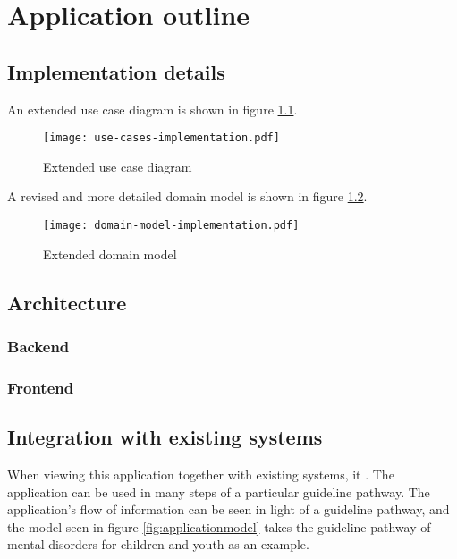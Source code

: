 \chapter{Application outline}
\label{ch:outline}

\section{Implementation details}

An extended use case diagram is shown in figure \ref{fig:usecases2}.

\begin{figure}
    \centering
    \texttt{[image: use-cases-implementation.pdf]}
    \caption{Extended use case diagram}
    \label{fig:usecases2}
\end{figure}

A revised and more detailed domain model is shown in figure \ref{fig:domainmodel2}.

\begin{figure}
    \centering
    \texttt{[image: domain-model-implementation.pdf]}
    \caption{Extended domain model}
    \label{fig:domainmodel2}
\end{figure}

\section{Architecture}

\subsection{Backend}

\subsection{Frontend}

\section{Integration with existing systems}

When viewing this application together with existing systems, it . The application can be used in many steps of a particular guideline pathway. The application's flow of information can be seen in light of a guideline pathway, and the model seen in figure \ref{fig:applicationmodel} takes the guideline pathway of mental disorders for children and youth \parencite{helsedirektoratet2019} as an example.

